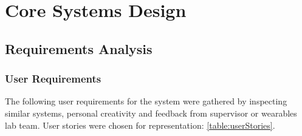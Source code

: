 \chapter{Core Systems Design}
\label{cha:core_system_design}
\section{Requirements Analysis}
\subsection{User Requirements}
The following user requirements for the system were gathered by inspecting similar systems, personal creativity and feedback from supervisor or wearables lab team. User stories were chosen for representation: \ref{table:userStories}.

